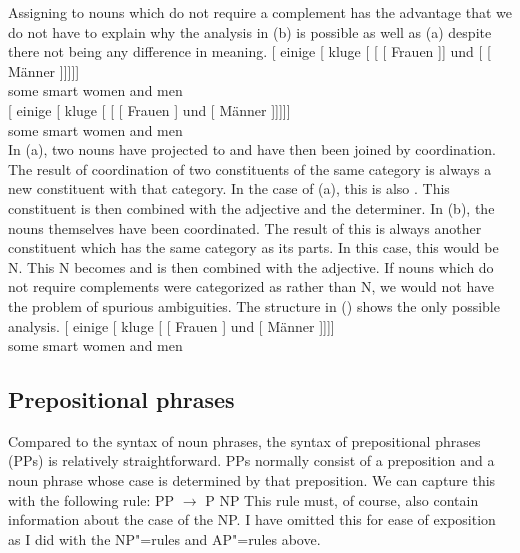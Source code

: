 Assigning \nbar to nouns which do not require a complement has the advantage that we do not have to explain why the analysis in (b) is possible as well
as (a) despite there not being any difference in meaning.
\eal
\label{ex-einige-kluge-Frauen-und-Maenner}
\ex 
\gll {}[ einige [\sub{\nbar} kluge [\sub{\nbar} [\sub{\nbar} [ Frauen ]] und  [\sub{\nbar} [ Männer ]]]]]\\
	 {}      some   {}           smart {}          {}           {}       women  {} and {} {}          men\\
\ex 
\gll {}[ einige [\sub{\nbar} kluge [\sub{\nbar} [ [ Frauen ] und [ Männer ]]]]]\\
	{}       some   {}           smart {}          {}       {}       women  {} and {} men\\
\zl
%
In (a), two nouns have projected to \nbar and have then been joined by coordination. The result of coordination
of two constituents of the same category is always a new constituent with that category. In the case of (a), this
is also \nbar. This constituent is then combined with the adjective and the determiner. In (b), the nouns themselves
have been coordinated. The result of this is always another constituent which has the same category as its parts. In this case,
this would be N. This N becomes \nbar and is then combined with the adjective. If nouns which do not require complements were
categorized as \nbar rather than N, we would not have the problem of spurious ambiguities. The
structure in () shows the only possible analysis.
\ea
\gll {}[ einige [\sub{\nbar} kluge [\sub{\nbar} [\sub{\nbar} Frauen ] und [\sub{\nbar} Männer
]]]]\\
      {}	some    {}           smart {}          {}           women  {}  and {} men\\
\z

\subsection{Prepositional phrases}
\label{Abschnitt-PP-Syntax}

Compared to the syntax of noun phrases, the syntax of prepositional phrases (PPs) is relatively straightforward. PPs normally 
consist of a preposition and a noun phrase whose case is determined by that preposition. We can capture this with the following
rule:
\ea
\label{Regel-PP-einfach}
PP $\to$ P NP
\z
This rule must, of course, also contain information about the case of the NP. I have omitted this for ease of exposition as I did
with the NP"=rules and AP"=rules above.

